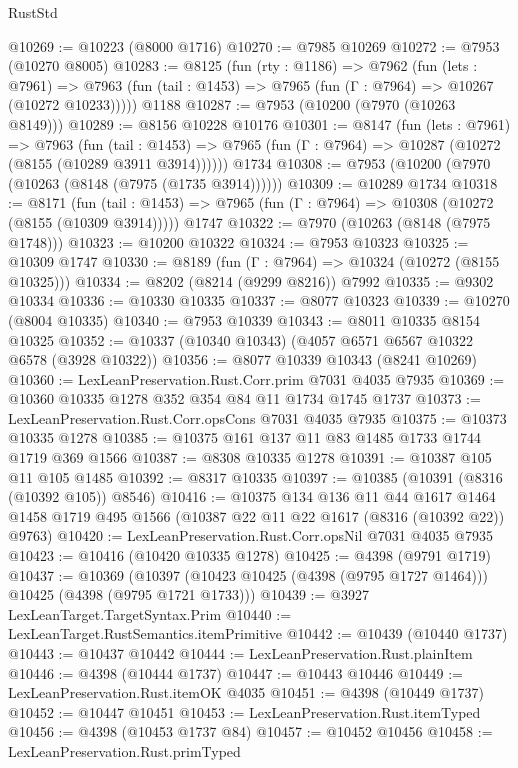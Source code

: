 \begin{lexlean}{RustStd}
\begin{coremodule}
@10269 := @10223 (@8000 @1716)
@10270 := @7985 @10269
@10272 := @7953 (@10270 @8005)
@10283 := @8125
    (fun (rty : @1186) =>
    @7962
      (fun (lets : @7961) =>
      @7963 (fun (tail : @1453) => @7965 (fun (Γ : @7964) => @10267 (@10272 @10233)))))
    @1188
@10287 := @7953 (@10200 (@7970 (@10263 @8149)))
@10289 := @8156 @10228 @10176
@10301 := @8147
    (fun (lets : @7961) =>
    @7963
      (fun (tail : @1453) =>
      @7965 (fun (Γ : @7964) => @10287 (@10272 (@8155 (@10289 @3911 @3914))))))
    @1734
@10308 := @7953 (@10200 (@7970 (@10263 (@8148 (@7975 (@1735 @3914))))))
@10309 := @10289 @1734
@10318 := @8171
    (fun (tail : @1453) => @7965 (fun (Γ : @7964) => @10308 (@10272 (@8155 (@10309 @3914)))))
    @1747
@10322 := @7970 (@10263 (@8148 (@7975 @1748)))
@10323 := @10200 @10322
@10324 := @7953 @10323
@10325 := @10309 @1747
@10330 := @8189 (fun (Γ : @7964) => @10324 (@10272 (@8155 @10325)))
@10334 := @8202 (@8214 (@9299 @8216)) @7992
@10335 := @9302 @10334
@10336 := @10330 @10335
@10337 := @8077 @10323
@10339 := @10270 (@8004 @10335)
@10340 := @7953 @10339
@10343 := @8011 @10335 @8154 @10325
@10352 := @10337 (@10340 @10343) (@4057 @6571 @6567 @10322 @6578 (@3928 @10322))
@10356 := @8077 @10339 @10343 (@8241 @10269)
@10360 := LexLeanPreservation.Rust.Corr.prim @7031 @4035 @7935
@10369 := @10360 @10335 @1278 @352 @354 @84 @11 @1734 @1745 @1737
@10373 := LexLeanPreservation.Rust.Corr.opsCons @7031 @4035 @7935
@10375 := @10373 @10335 @1278
@10385 := @10375 @161 @137 @11 @83 @1485 @1733 @1744 @1719 @369 @1566
@10387 := @8308 @10335 @1278
@10391 := @10387 @105 @11 @105 @1485
@10392 := @8317 @10335
@10397 := @10385 (@10391 (@8316 (@10392 @105)) @8546)
@10416 := @10375
    @134
    @136
    @11
    @44
    @1617
    @1464
    @1458
    @1719
    @495
    @1566
    (@10387 @22 @11 @22 @1617 (@8316 (@10392 @22)) @9763)
@10420 := LexLeanPreservation.Rust.Corr.opsNil @7031 @4035 @7935
@10423 := @10416 (@10420 @10335 @1278)
@10425 := @4398 (@9791 @1719)
@10437 := @10369
    (@10397 (@10423 @10425 (@4398 (@9795 @1727 @1464))) @10425 (@4398 (@9795 @1721 @1733)))
@10439 := @3927 LexLeanTarget.TargetSyntax.Prim
@10440 := LexLeanTarget.RustSemantics.itemPrimitive
@10442 := @10439 (@10440 @1737)
@10443 := @10437 @10442
@10444 := LexLeanPreservation.Rust.plainItem
@10446 := @4398 (@10444 @1737)
@10447 := @10443 @10446
@10449 := LexLeanPreservation.Rust.itemOK @4035
@10451 := @4398 (@10449 @1737)
@10452 := @10447 @10451
@10453 := LexLeanPreservation.Rust.itemTyped
@10456 := @4398 (@10453 @1737 @84)
@10457 := @10452 @10456
@10458 := LexLeanPreservation.Rust.primTyped

\end{coremodule}
\end{lexlean}
